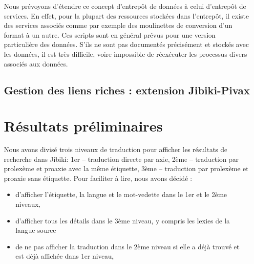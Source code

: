 \documentclass[10pt,a4paper,twoside]{article}
\begin{document}
\begin{itemize}
Nous prévoyons d'étendre ce concept d'entrepôt de données à celui d'entrepôt de services. En effet, pour la plupart des ressources stockées dans l'entrepôt, il existe des services associés comme par exemple des moulinettes de conversion d'un format à un autre. Ces scripts sont en général prévus pour une version particulière des données. S'ils ne sont pas documentés précisément et stockés avec les données, il est très difficile, voire impossible de réexécuter les processus divers associés aux données.


\subsection{Gestion des liens riches : extension Jibiki-Pivax}


\section{Résultats préliminaires}

Nous avons divisé trois niveaux de traduction pour afficher les résultats de recherche dans Jibiki: 1er – traduction directe par axie, 2ème – traduction par prolexème et proaxie avec la même étiquette, 3ème – traduction par prolexème et proaxie sans étiquette.  Pour faciliter à lire, nous avons décidé : 
\begin{itemize}
\begin{itemize}
\item d’afficher l’étiquette, la langue et le mot-vedette dans le 1er et le 2ème niveaux, 
\item d’afficher tous les détails dans le 3ème niveau, y compris les lexies de la langue source
\item de ne pas afficher la traduction dans le 2ème niveau si elle a déjà trouvé et est déjà affichée dans 1er niveau,
\end{itemize}
\end{itemize}


\end{itemize}
\end{document}
